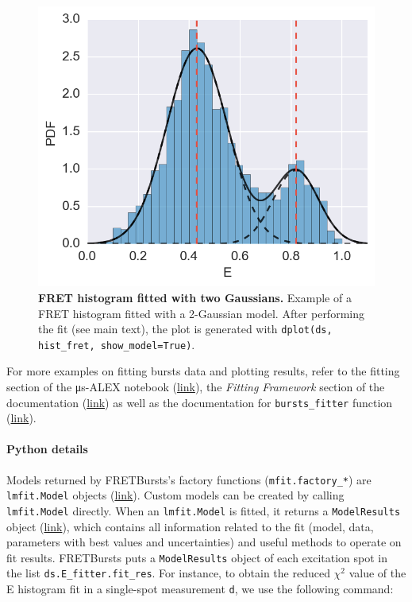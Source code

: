 \documentclass[10pt,letterpaper]{article}
\begin{document}
\begin{figure}[h!]
\begin{center}
\includegraphics[width=0.49\columnwidth]{figures/hist_fit/hist_fit}
\caption{\label{fig:histfit} \textbf{FRET histogram fitted with two Gaussians.}
Example of a FRET histogram fitted with a 2-Gaussian model.
After performing the fit (see main text), the plot is generated 
with \texttt{dplot(ds, hist\_fret, show\_model=True)}.%
}
\end{center}
\end{figure}

For more examples on fitting bursts data and plotting results, refer to the
fitting section of the μs-ALEX notebook (\href{http://nbviewer.jupyter.org/github/tritemio/FRETBursts_notebooks/blob/master/notebooks/FRETBursts%20-%20us-ALEX%20smFRET%20burst%20analysis.ipynb#FRET-fit:-in-depth-example}{link}),
the \textit{Fitting Framework} section of the documentation
(\href{http://fretbursts.readthedocs.org/en/latest/fit.html}{link})
as well as the documentation for \verb|bursts_fitter| function
(\href{http://fretbursts.readthedocs.org/en/latest/plugins.html#fretbursts.burstlib_ext.bursts_fitter}{link}).

\paragraph{Python details}

Models returned by FRETBursts's factory functions (\verb|mfit.factory_*|)
are \verb|lmfit.Model| objects (\href{https://lmfit.github.io/lmfit-py/model.html}{link}).
Custom models can be created by calling \verb|lmfit.Model| directly.
When an \verb|lmfit.Model| is fitted, it returns a \verb|ModelResults| object
(\href{https://lmfit.github.io/lmfit-py/model.html#the-modelresult-class}{link}),
which contains all information related to the fit (model, data,
parameters with best values and uncertainties) and useful methods to operate on fit results.
FRETBursts puts a \verb|ModelResults| object of each excitation spot in the list
\verb|ds.E_fitter.fit_res|.
For instance, to obtain the reduced $\chi^2$ value of the E histogram fit in a
single-spot measurement \verb|d|, we use the following command:
\end{document}
